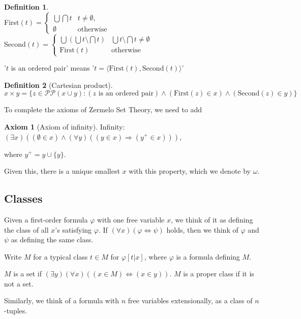 \documentclass[a4paper]{article}
\theoremstyle{definition}
\newtheorem*{defi}{Definition}
\newtheorem*{axiom}{Axiom}
\newcommand{\bra}{\langle}
\newcommand{\ket}{\rangle}
\begin{document}
\begin{defi}\leavevmode\\
  First$(t) = 
  \begin{cases}
      \bigcup\bigcap t & t\not= \emptyset, \\
      \emptyset & \text{otherwise}
  \end{cases}$\\
  Second$(t) = 
  \begin{cases}
    \bigcup(\bigcup t\setminus \bigcap t) & \bigcup t\setminus \bigcap t \not= \emptyset\\
    \text{First}(t) & \text{otherwise}
  \end{cases}$
\end{defi}

'$t$ is an ordered pair' means '$t = \bra \text{First}(t),\text{Second}(t)\ket$'

\begin{defi}[Cartesian product]
  $$x\times y = \{z\in \mathcal{PP}(x\cup y): (z\text{ is an ordered pair})\wedge(\text{First}(z)\in x)\wedge(\text{Second}(z)\in y)\}$$
\end{defi}

To complete the axioms of Zermelo Set Theory, we need to add
\begin{axiom}[Axiom of infinity]
  Infinity: $(\exists x)((\emptyset\in x)\wedge (\forall y)((y\in x)\Rightarrow (y^+\in x)))$,

  where $y^+ = y\cup \{y\}$. 
\end{axiom}
Given this, there is a unique smallest $x$ with this property, which we denote by $\omega$.
\subsection{Classes}
Given a first-order formula $\varphi$ with one free variable $x$, we think of it as defining the class of all $x$'s satisfying $\varphi$. If $(\forall x)(\varphi\Leftrightarrow \psi)$ holds, then we think of $\varphi$ and $\psi$ as defining the same class.

Write $M$ for a typical class $t\in M$ for $\varphi[t|x]$, where $\varphi$ is a formula defining $M$.

$M$ is a set if $(\exists y)(\forall x)((x\in M)\Leftrightarrow (x\in y))$. $M$ is a proper class if it is not a set.

Similarly, we think of a formula with $n$ free variables extensionally, as a class of $n$-tuples.
\end{document}
